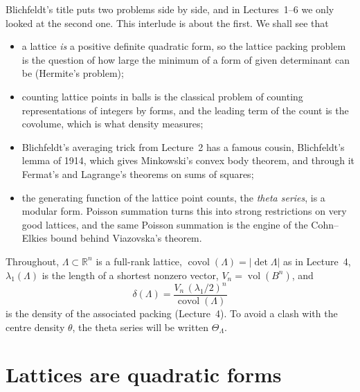 \documentclass[11pt,openany]{book}
\theoremstyle{plain}
\theoremstyle{definition}
\theoremstyle{remark}
\newcommand{\R}{\mathbb{R}}
\newcommand{\Lat}{\Lambda}             %
\newcommand{\vol}{\operatorname{vol}}
\newcommand{\covol}{\operatorname{covol}}
\newcommand{\abs}[1]{\left\lvert #1 \right\rvert}
\newcommand{\dens}{\delta}             %
\newcommand{\cent}{\theta}             %
\newcommand{\Ball}{B}                  %
\begin{document}
Blichfeldt's title puts two problems side by side, and in Lectures~1--6 we only looked at the second
one. This interlude is about the first. We shall see that
\begin{itemize}
\item a lattice \emph{is} a positive definite quadratic form, so the lattice packing problem is the
  question of how large the minimum of a form of given determinant can be (Hermite's problem);
\item counting lattice points in balls is the classical problem of counting representations of integers
  by forms, and the leading term of the count is the covolume, which is what density measures;
\item Blichfeldt's averaging trick from Lecture~2 has a famous cousin, Blichfeldt's lemma of 1914, which
  gives Minkowski's convex body theorem, and through it Fermat's and Lagrange's theorems on sums of squares;
\item the generating function of the lattice point counts, the \emph{theta series}, is a modular form.
  Poisson summation turns this into strong restrictions on very good lattices, and the same Poisson
  summation is the engine of the Cohn--Elkies bound behind Viazovska's theorem.
\end{itemize}
Throughout, $\Lat\subset\R^n$ is a full-rank lattice, $\covol(\Lat)=\abs{\det\Lat}$ as in Lecture~4,
$\lambda_1(\Lat)$ is the length of a shortest nonzero vector, $V_n=\vol(\Ball^n)$, and
\[
  \dens(\Lat)=\frac{V_n\,(\lambda_1/2)^n}{\covol(\Lat)}
\]
is the density of the associated packing (Lecture~4). To avoid a clash with the centre density
$\cent$, the theta series will be written $\Theta_\Lat$.

\section{Lattices are quadratic forms}
\label{NT:sec:forms}
\end{document}
